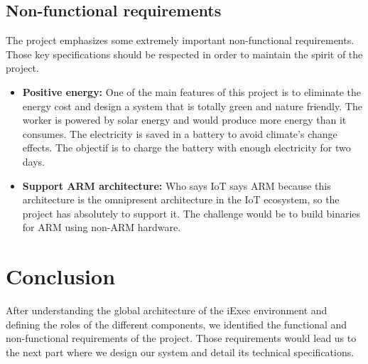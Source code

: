     \subsection{Non-functional requirements}
        The project emphasizes some extremely important non-functional requirements. Those key specifications should be
        respected in order to maintain the spirit of the project.
        \begin{itemize}
            \item \textbf{Positive energy:} One of the main features of this project is to eliminate the energy cost and
            design a system that is totally green and nature friendly. The worker is powered by solar energy and would
            produce more energy than it consumes. The electricity is saved in a battery to avoid climate's change effects.
            The objectif is to charge the battery with enough electricity for two days.

            \item \textbf{Support ARM architecture:} Who says IoT says ARM\cite{ARM} because this architecture is the
            omnipresent architecture in the IoT ecosystem, so the project has absolutely to support it. The challenge
            would be to build binaries for ARM using non-ARM hardware.
        \end{itemize}

\section{Conclusion}
    After understanding the global architecture of the iExec environment and defining the roles of the different components,
    we identified the functional and non-functional requirements of the project. Those requirements would lead us to the next
    part where we design our system and detail its technical specifications.